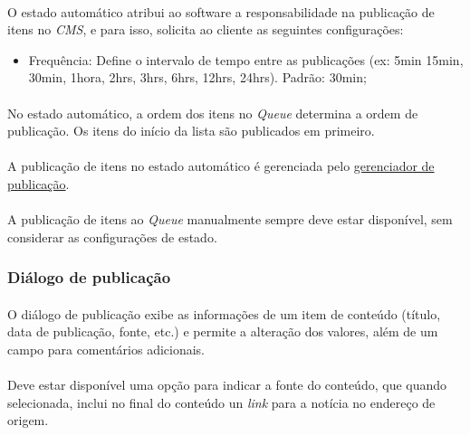 \documentclass[a4paper,12pt]{article}
\def\blog{\emph{CMS}}
\def\queue{\emph{Queue}}
\def\gerenciadorpublicacao{\hyperref[gerenciadorpublicacao]{gerenciador de publicação}}
\begin{document}
\paragraph{}
O estado automático atribui ao software a responsabilidade na publicação de
itens no \blog{}, e para isso, solicita ao cliente as seguintes configurações:

\begin{itemize}

\item Frequência: Define o intervalo de tempo entre as publicações (ex: 5min
15min, 30min, 1hora, 2hrs, 3hrs, 6hrs, 12hrs, 24hrs). Padrão: 30min;

\end{itemize}

\paragraph{}
No estado automático, a ordem dos itens no \queue{} determina a ordem de
publicação. Os itens do início da lista são publicados em primeiro.

\paragraph{}
A publicação de itens no estado automático é gerenciada pelo \gerenciadorpublicacao{}.

\paragraph{}
A publicação de itens ao \queue{} manualmente sempre deve estar disponível, sem
considerar as configurações de estado.

\subsubsection{Diálogo de publicação} \label{dialogopublicacao}

\paragraph{}
O diálogo de publicação exibe as informações de um item de conteúdo (título,
data de publicação, fonte, etc.) e permite a alteração dos valores, além de um
campo para comentários adicionais.

\paragraph{}
Deve estar disponível uma opção para indicar a fonte do conteúdo, que quando
selecionada, inclui no final do conteúdo un \emph{link} para a notícia no
endereço de origem.
\end{document}
